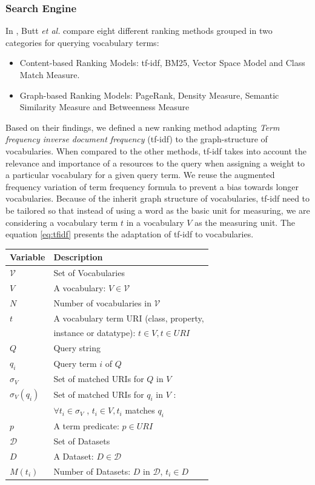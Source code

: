 \documentclass{iosart2c}
\begin{document}
\subsubsection{Search Engine}
In \cite{butt2014}, Butt \emph{et al.} compare eight different ranking methods grouped in two categories for querying vocabulary terms:
\begin{itemize}
	\item Content-based Ranking Models: tf-idf, BM25, Vector Space Model and Class Match Measure.
	\item Graph-based Ranking Models: PageRank, Density Measure, Semantic Similarity Measure and Betweenness Measure
\end{itemize}
Based on their findings, we defined a new ranking method adapting \emph{Term frequency inverse document frequency} (tf-idf) to the graph-structure of vocabularies. When compared to the other methods, tf-idf takes into account the relevance and importance of a resources to the query when assigning a weight to a particular vocabulary for a given query term. We reuse the augmented frequency variation of term frequency formula to prevent a bias towards longer vocabularies. Because of the inherit graph structure of vocabularies, tf-idf need to be tailored so that instead of using a word as the basic unit for measuring, we are considering a vocabulary term $t$ in a vocabulary $V$ as the measuring unit. The equation \ref{eq:tfidf} presents the adaptation of tf-idf to vocabularies.

\begin{table}[h!tb]
\begin{tabular}{|l|l|}
  \hline
  \textbf{Variable} & \textbf{Description} \\ \hline
  $\mathcal{V}$ & Set of Vocabularies \\ \hline
  $V$ & A vocabulary: $V \in \mathcal{V}$ \\ \hline
  $N$ & Number of vocabularies in $\mathcal{V}$ \\ \hline
  $t$ & A vocabulary term URI (class, property, \\
       &  instance or datatype): $t \in V, t \in URI$ \\ \hline
  $Q$ & Query string \\ \hline
  $q_i$ & Query term $i$ of $Q$ \\ \hline
  $\sigma_V$ & Set of matched URIs for $Q$ in $V$ \\ \hline
  $\sigma_V(q_i)$ & Set of matched URIs for $q_i$ in $V$ : \\
         & $\forall t_i \in \sigma_V$ , $t_i \in V ,  t_i$ matches $q_i$ \\ \hline
  $p$ & A term predicate: $p \in URI$ \\ \hline
  $\mathcal{D}$ & Set of Datasets \\ \hline
  $D$ & A Dataset: $D \in \mathcal{D}$ \\ \hline
  $M(t_i)$ & Number of Datasets: $D$ in $\mathcal{D}$, $t_i \in D$ \\ \hline
\end{tabular}
\end{table}
\end{document}
